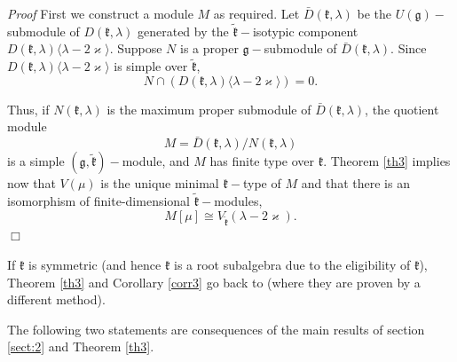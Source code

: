 \documentclass[default]{./styles/svmult}
\renewenvironment{proof}{ \emph{Proof}}{$\Box$}
\renewcommand{\gg}{\mathfrak{g}}
\newcommand{\kk}{\mathfrak{k}}
\begin{document}
\begin{proof}
First we construct a module $M$ as required. Let $\bar{D}(\kk,\lambda)$ be the $U(\gg)-$submodule of $D(\kk,\lambda)$ generated by the $\tilde{\kk}-$isotypic component $D(\kk,\lambda)\langle\lambda-2\varkappa\rangle$. Suppose $N$ is a proper $\gg-$submodule of $\bar{D}(\kk,\lambda)$. Since $D(\kk,\lambda)\langle\lambda-2\varkappa\rangle$ is simple over $\tilde{\kk}$,
$$N \cap (D(\kk,\lambda)\langle\lambda-2\varkappa\rangle) = 0.$$

Thus, if $N(\kk,\lambda)$ is the maximum proper submodule of $\bar{D}(\kk,\lambda)$, the quotient module 
$$M = \bar{D}(\kk,\lambda)/N(\kk,\lambda)$$
is a simple $(\gg,\tilde{\kk})-$module, and $M$ has finite type over $\kk$. Theorem \ref{th3} implies now that $V(\mu)$ is the unique minimal $\kk-$type of $M$ and that there is an isomorphism of finite-dimensional $\tilde{\kk}-$modules,
$$M[\mu] \cong V_{\tilde{\kk}}(\lambda-2\varkappa).$$ 
\end{proof}


If $\kk$ is symmetric (and hence $\kk$ is a root subalgebra due to the eligibility of $\kk$), Theorem \ref{th3} and Corollary \ref{corr3} go back to \cite{V} (where they are proven by a different method).

The following two statements are consequences of the main results of section \ref{sect:2} and Theorem \ref{th3}.
\end{document}

